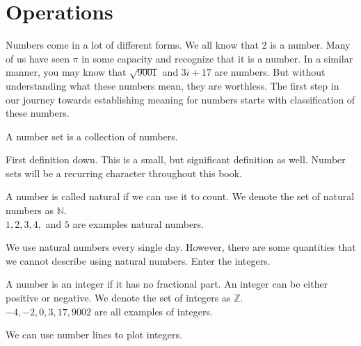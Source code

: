 \chapter{Operations}



Numbers come in a lot of different forms. We all know that 2 is a number. Many of us have seen $\pi$ in some capacity and recognize that it is a number. In a similar manner, you may know that $\sqrt{9001}$ and $3i + 17$ are numbers. But without understanding what these numbers mean, they are worthless. The first step in our journey towards establishing meaning for numbers starts with classification of these numbers.

\begin{presentation}
\begin{defn}\label{defn1}
	A number set is a collection of numbers.
\end{defn}
\end{presentation} 

First definition down. This is a small, but significant definition as well. Number sets will be a recurring character throughout this book. 

\begin{defn}\label{defn2}
	A number is called natural if we can use it to count. We denote the set of natural numbers as $\mathbb{N}$. \\ $1,2,3,4,$ and $5$ are examples natural numbers.
\end{defn}

We use natural numbers every single day. However, there are some quantities that we cannot describe using natural numbers. Enter the integers.

\begin{presentation}
\begin{defn}[Integer]
	A number is an integer if it has no fractional part. An integer can be either positive or negative. We denote the set of integers as $\mathbb{Z}$. \\$-4, -2, 0, 3,17,  9002$ are all examples of integers. 
\end{defn}
\end{presentation}

We can use number lines to plot integers.

\vspace{2cm}

\numline









